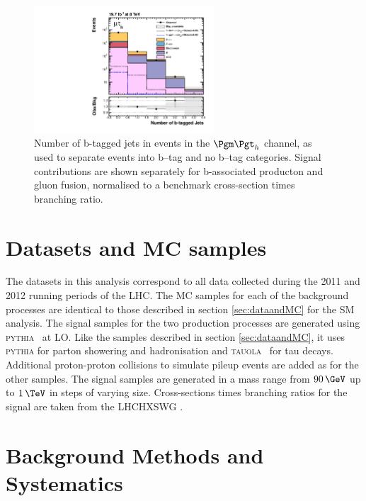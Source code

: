 \begin{figure}[tbh]
\includegraphics[width=0.6\textwidth]{plots/htt-mssm/n_bjets_inclusive_mt_2012_log.pdf}

\caption[Number of b-tagged jets in events in the $\mutau$ channel, as used to separate
events into b--tag and no b--tag categories]{Number of b-tagged jets in events
in the $\mutau$ channel, as used to separate
events into b--tag and no b--tag categories. Signal contributions are shown
separately for b-associated producton and gluon fusion, normalised to a
benchmark cross-section times branching ratio.}
\label{fig:nbtag}
\end{figure}

\section{Datasets and \ac{MC} samples}
\label{sec:mssmdataandMC}

The datasets in this analysis correspond to all data collected during the 2011
and 2012 running periods of the \ac{LHC}.
The \ac{MC} samples for each of the background processes are
identical to those described in section \ref{sec:dataandMC} for the \ac{SM}
analysis. The signal samples for the two production processes are
generated using \textsc{pythia}~\cite{Sjostrand:2006za} at \ac{LO}. Like the
samples described in section \ref{sec:dataandMC}, it uses \textsc{pythia}
for parton showering and hadronisation and \textsc{tauola}~\cite{TAUOLA} for tau
decays. Additional proton-proton collisions to simulate pileup events are added
as for the other samples. The signal samples are generated in a mass range from
$90\,\GeV$ up to $1\,\TeV$ in steps of varying size. Cross-sections times
branching ratios for the signal are taken from the \ac{LHCHXSWG}
\cite{LHCHiggsCrossSectionWorkingGroup:2011ti,Dittmaier:2012vm,Heinemeyer:2013tqa}.

\section{Background Methods and Systematics}
\label{sec:mssmBackgroundsSysts}


